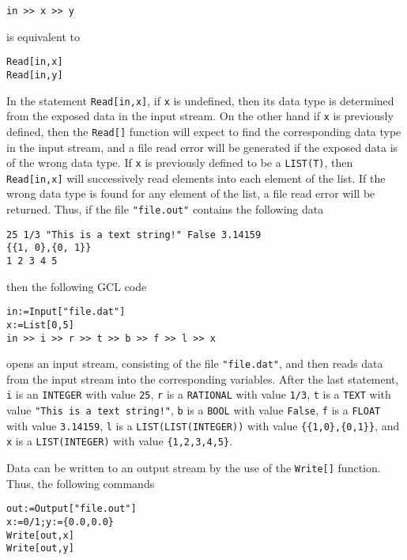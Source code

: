 \begin{verbatim}
in >> x >> y
\end{verbatim}
 
\noindent
is equivalent to 

\begin{verbatim}
Read[in,x]
Read[in,y]
\end{verbatim}

\noindent
In the statement \verb+Read[in,x]+, if \verb+x+ is undefined, then its
data type is determined from the exposed data in the input stream.  On
the other hand if \verb+x+ is previously defined, then the \verb+Read[]+
function will expect to find the corresponding data type in the input
stream, and a file read error will be generated if the exposed data is
of the wrong data type.  If \verb+x+ is previously defined to be a
\verb+LIST(T)+, then \verb+Read[in,x]+ will successively read elements into
each element of the list.  If the wrong data type is found for any
element of the list, a file read error will be returned.  Thus, if the
file \verb+"file.out"+ contains the following data

\begin{verbatim}
25 1/3 "This is a text string!" False 3.14159 
{{1, 0},{0, 1}}
1 2 3 4 5
\end{verbatim}

\noindent
then the following GCL code

\begin{verbatim}
in:=Input["file.dat"]
x:=List[0,5]
in >> i >> r >> t >> b >> f >> l >> x
\end{verbatim}

\noindent
opens an input stream, consisting of the file \verb+"file.dat"+, and
then reads data from the input stream into the corresponding
variables.  After the last statement, 
\verb+i+ is an \verb+INTEGER+ with value \verb+25+, 
\verb+r+ is a \verb+RATIONAL+ with value \verb+1/3+, 
\verb+t+ is a \verb+TEXT+ with value \verb+"This is a text string!"+, 
\verb+b+ is a \verb+BOOL+ with value \verb+False+, 
\verb+f+ is a \verb+FLOAT+ with value \verb+3.14159+, 
\verb+l+ is a \verb+LIST(LIST(INTEGER))+ with value \verb+{{1,0},{0,1}}+, and 
\verb+x+ is a \verb+LIST(INTEGER)+ with value \verb+{1,2,3,4,5}+.  

Data can be written to an output stream by the use of the \verb+Write[]+
function.  Thus, the following commands

\begin{verbatim}
out:=Output["file.out"]
x:=0/1;y:={0.0,0.0}
Write[out,x]
Write[out,y]
\end{verbatim}

